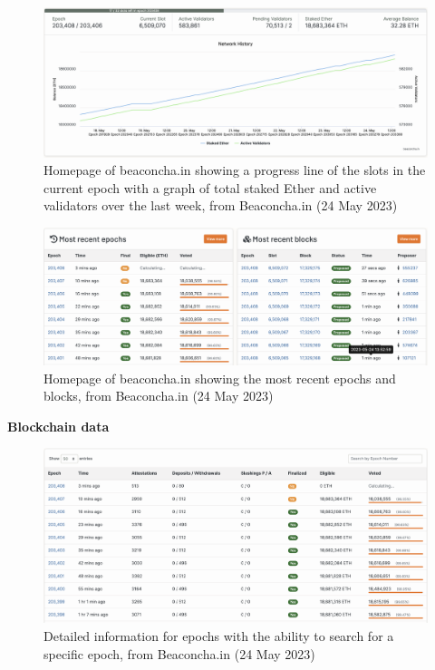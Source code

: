 \documentclass[UTF8]{article}
\begin{document}
\begin{figure}[htbp]
\begin{center}
\includegraphics[width=0.9\linewidth]{images/bhomepg}
\caption{Homepage of beaconcha.in showing a progress line of the slots in the current epoch with a graph of total staked Ether and active validators over the last week, from Beaconcha.in (24 May 2023)}
\label{fig:bhomepg}
\end{center}
\end{figure}

\begin{figure}[htbp]
\begin{center}
\includegraphics[width=0.9\linewidth]{images/bhomepg2}
\caption{Homepage of beaconcha.in showing the most recent epochs and blocks, from Beaconcha.in (24 May 2023)}
\label{fig:bhomepg2}
\end{center}
\end{figure}
\clearpage


\textbf{Blockchain data}
\begin{figure}[htbp]
\begin{center}
\includegraphics[width=0.9\linewidth]{images/bepochs}
\caption{Detailed information for epochs with the ability to search for a specific epoch, from Beaconcha.in (24 May 2023)}
\label{fig:bepochs}
\end{center}
\end{figure}
\end{document}
